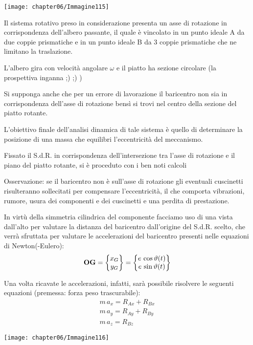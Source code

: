 \begin{minipage}{.5\textwidth}
\centering
\texttt{[image: chapter06/Immagine115]}
\end{minipage}
\hfill
\begin{minipage}{.45\textwidth}
Il sistema rotativo preso in considerazione presenta un asse di rotazione in corrispondenza dell'albero passante, il quale è vincolato in un punto ideale A da due coppie prismatiche e in un punto ideale B da 3 coppie prismatiche che ne limitano la traslazione.
\newline

L'albero gira con velocità angolare $\omega$ e il piatto ha sezione circolare (la prospettiva inganna ;) ;) )
\newline

Si supponga anche che per un errore di lavorazione il baricentro non sia in corrispondenza dell'asse di rotazione bensì si trovi nel centro della sezione del piatto rotante.

L'obiettivo finale dell'analisi dinamica di tale sistema è quello di determinare la posizione di una massa che equilibri l'eccentricità del meccanismo.

Fissato il S.d.R. in corrispondenza dell'intersezione tra l'asse di rotazione e il piano del piatto rotante, si è proceduto con i ben noti calcoli
\end{minipage}

Osservazione: se il baricentro non è sull'asse di rotazione gli eventuali cuscinetti risulteranno sollecitati per compensare l'eccentricità, il che comporta vibrazioni, rumore, usura dei componenti e dei cuscinetti e una perdita di prestazione.
\vspace{1mm}

\begin{minipage}{.5\textwidth}
In virtù della simmetria cilindrica del componente facciamo uso di una vista dall'alto per valutare la distanza del baricentro dall'origine del S.d.R. scelto, che verrà sfruttata per valutare le accelerazioni del baricentro presenti nelle equazioni di Newton(-Eulero):
\begin{gather*}
\mathbf{OG} = \begin{Bmatrix}x_G\\y_G\end{Bmatrix} = \begin{Bmatrix}e\,\cos{\vartheta(t)}\\e\,\sin{\vartheta(t)}\end{Bmatrix}
\end{gather*}

Una volta ricavate le accelerazioni, infatti, sarà possibile risolvere le seguenti equazioni (premessa: forza peso trascurabile):
\begin{gather*}
m\,a_x = R_{Ax} + R_{Bx}\\
m\,a_y = R_{Ay} + R_{By}\\
m\,a_z = R_{Bz}
\end{gather*}
\end{minipage}
\hfill
\begin{minipage}{.5\textwidth}
\centering
\texttt{[image: chapter06/Immagine116]}
\end{minipage}

